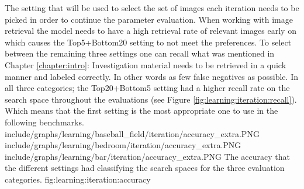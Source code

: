The setting that will be used to select the set of images each iteration needs to be picked in order to continue the parameter evaluation. When working with image retrieval the model needs to have a high retrieval rate of relevant images early on which causes the Top5+Bottom20 setting to not meet the preferences. To select between the remaining three settings one can recall what was mentioned in Chapter \ref{chapter:intro}: Investigation material needs to be retrieved in a quick manner and labeled correctly. In other words as few false negatives as possible. In all three categories; the Top20+Bottom5 setting had a higher recall rate on the search space throughout the evaluations (see Figure \ref{fig:learning:iteration:recall}). Which means that the first setting is the most appropriate one to use in the following benchmarks. 
\tripfigure
{include/graphs/learning/baseball_field/iteration/accuracy_extra.PNG}
{include/graphs/learning/bedroom/iteration/accuracy_extra.PNG}
{include/graphs/learning/bar/iteration/accuracy_extra.PNG}
{The accuracy that the different settings had classifying the search spaces for the three evaluation categories.}
{fig:learning:iteration:accuracy}
